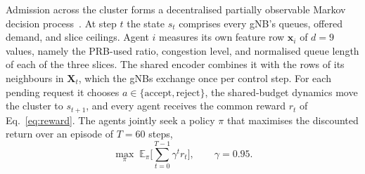 \documentclass[pdflatex,sn-basic,Numbered]{sn-jnl}
\begin{document}
Admission across the cluster forms a decentralised partially observable Markov decision process~\cite{gronauer2022marl}. At step $t$ the state $s_t$ comprises every gNB's queues, offered demand, and slice ceilings. Agent $i$ measures its own feature row $\mathbf{x}_i$ of $d=9$ values, namely the PRB-used ratio, congestion level, and normalised queue length of each of the three slices. The shared encoder combines it with the rows of its neighbours in $\mathbf{X}_t$, which the gNBs exchange once per control step. For each pending request it chooses $a\in\{\text{accept},\text{reject}\}$, the shared-budget dynamics move the cluster to $s_{t+1}$, and every agent receives the common reward $r_t$ of Eq.~\eqref{eq:reward}. The agents jointly seek a policy $\pi$ that maximises the discounted return over an episode of $T{=}60$ steps,
\begin{equation}
\max_{\pi}\;\mathbb{E}_{\pi}\Big[\textstyle\sum_{t=0}^{T-1}\gamma^{t} r_t\Big],\qquad \gamma=0.95.
\end{equation}
\end{document}
